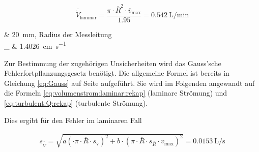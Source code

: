 
\begin{equation}
    \label{eq:volumenstrom:laminar:rekap}
    \overline{\dot{V}}_{\mathrm{laminar}} = \frac{\pi \cdot \overline{R}^2 \cdot \overline{v}_{\mathrm{max}}}{1.95} = \SI{0.542}{\liter\per\minute}
\end{equation}

\begin{conditions}
     & \SI{20}{\milli\meter}, Radius der Messleitung \\
    _{} & \SI{1.4026}{\centi\meter\per\second} \\
\end{conditions}

Zur   Bestimmung  der   zugeh\"origen  Unsicherheiten   wird  das   Gauss'sche
Fehlerfortpflanzungsgesetz  ben\"otigt. Die allgemeine  Formel ist  bereits in
Gleichung \ref{eq:Gauss}  auf Seite \pageref{eq:Gauss}  aufgef\"uhrt. Sie wird
im  Folgenden angewandt  auf  die Formeln  \ref{eq:volumenstrom:laminar:rekap}
(laminare Str\"omung) und \ref{eq:turbulent:Q:rekap} (turbulente Str\"omung).

\clearpage
Dies ergibt f\"ur den Fehler im laminaren Fall

\begin{equation}
    \label{eq:errorLaminar}
    \begin{split}
        s_{\overline{\dot{V}}} = \sqrt{
            a
            \left(
            \cdot
            \pi
            \cdot
            \overline{R}
            \cdot
            s_{\mathrm{\overline{v}}}
            \right)^2
            +
            b
            \cdot
            \left(
            \pi
            \cdot
            \overline{R}
            \cdot
            s_{\overline{R}}
            \cdot
            v_{\mathrm{max}}
            \right)^2
        }
        =
        \SI{0.0153}{\liter\per\second}
    \end{split}
\end{equation}

